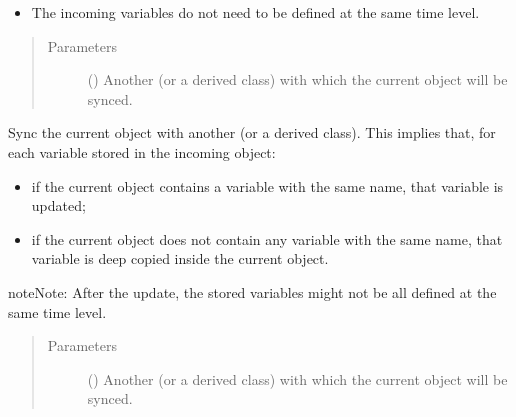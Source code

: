 \documentclass[letterpaper,10pt,english]{sphinxmanual}
\begin{document}
\begin{fulllineitems}
\begin{fulllineitems}
\begin{itemize}
\item {} 
The incoming variables do not need to be defined at the same time level.

\end{itemize}
\begin{quote}\begin{description}
\item[{Parameters}] \leavevmode
{} () \textendash{} Another {\hyperref[\detokenize{api:tasmania.storages.grid_data.GridData}]{}} (or a derived class)
with which the current object will be synced.

\end{description}\end{quote}

\end{fulllineitems}


\begin{fulllineitems}
\label{\detokenize{api:tasmania.storages.grid_data.GridData.extend_and_update}}
Sync the current object with another {\hyperref[\detokenize{api:tasmania.storages.grid_data.GridData}]{}} (or a derived class).
This implies that, for each variable stored in the incoming object:
\begin{itemize}
\item {} 
if the current object contains a variable with the same name, that variable is updated;

\item {} 
if the current object does not contain any variable with the same name, that variable is deep copied inside                   the current object.

\end{itemize}

\begin{sphinxadmonition}{note}{Note:}
After the update, the stored variables might not be all defined at the same time level.
\end{sphinxadmonition}
\begin{quote}\begin{description}
\item[{Parameters}] \leavevmode
{} () \textendash{} Another {\hyperref[\detokenize{api:tasmania.storages.grid_data.GridData}]{}} (or a derived class)
with which the current object will be synced.


\end{description}
\end{quote}
\end{fulllineitems}
\end{fulllineitems}
\end{document}
